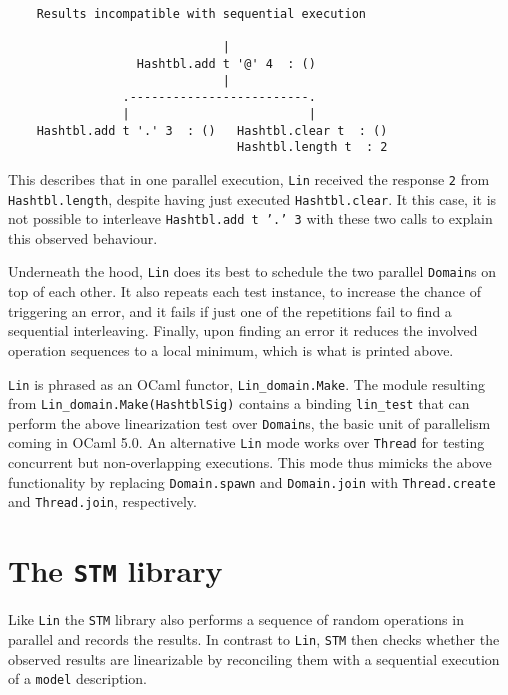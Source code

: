 \documentclass[twocolumn,10pt]{article}
\begin{document}
\begingroup{}
\begin{lstlisting}
    Results incompatible with sequential execution
    
                              |
                  Hashtbl.add t '@' 4  : ()
                              |
                .-------------------------.
                |                         |
    Hashtbl.add t '.' 3  : ()   Hashtbl.clear t  : ()
                                Hashtbl.length t  : 2
\end{lstlisting}
\endgroup

This describes that in one parallel execution, \texttt{Lin} received the
response \texttt{2} from \texttt{Hashtbl.length}, despite having just executed
\texttt{Hashtbl.clear}.  It this case, it is not possible to interleave
\texttt{Hashtbl.add t '.' 3} with these two calls to explain this observed
behaviour.

Underneath the hood, \texttt{Lin} does its best to schedule the two parallel
\texttt{Domain}s on top of each other. It also repeats each test instance, to
increase the chance of triggering an error, and it fails if just one
of the repetitions fail to find a sequential interleaving. Finally,
upon finding an error it reduces the involved operation sequences to a
local minimum, which is what is printed above.

\texttt{Lin} is phrased as an OCaml functor, \lstinline|Lin_domain.Make|. The module
resulting from \lstinline|Lin_domain.Make(HashtblSig)| contains a binding \lstinline|lin_test|
that can perform the above linearization test over \texttt{Domain}s, the
basic unit of parallelism coming in OCaml 5.0. An alternative \texttt{Lin}
mode works over \texttt{Thread} for testing concurrent but non-overlapping
executions. This mode thus mimicks the above functionality by
replacing \texttt{Domain.spawn} and \texttt{Domain.join} with \texttt{Thread.create} and
\texttt{Thread.join}, respectively.


\section{The \texttt{STM} library}

Like \texttt{Lin} the \texttt{STM} library also performs a sequence of random
operations in parallel and records the results. In contrast to \texttt{Lin},
\texttt{STM} then checks whether the observed results are linearizable by
reconciling them with a sequential execution of a \texttt{model} description.
\end{document}
